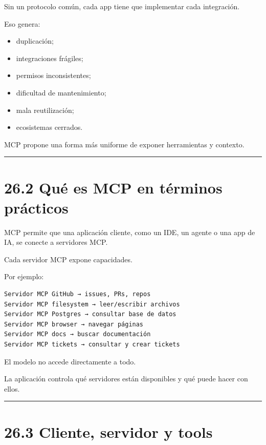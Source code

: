 Sin un protocolo común, cada app tiene que implementar cada integración.

Eso genera:

\begin{itemize}
\tightlist
\item
  duplicación;
\item
  integraciones frágiles;
\item
  permisos inconsistentes;
\item
  dificultad de mantenimiento;
\item
  mala reutilización;
\item
  ecosistemas cerrados.
\end{itemize}

MCP propone una forma más uniforme de exponer herramientas y contexto.

\begin{center}\rule{0.5\linewidth}{0.5pt}\end{center}

\section{26.2 Qué es MCP en términos
prácticos}\label{quuxe9-es-mcp-en-tuxe9rminos-pruxe1cticos}

MCP permite que una aplicación cliente, como un IDE, un agente o una app
de IA, se conecte a servidores MCP.

Cada servidor MCP expone capacidades.

Por ejemplo:

\begin{lstlisting}
Servidor MCP GitHub → issues, PRs, repos
Servidor MCP filesystem → leer/escribir archivos
Servidor MCP Postgres → consultar base de datos
Servidor MCP browser → navegar páginas
Servidor MCP docs → buscar documentación
Servidor MCP tickets → consultar y crear tickets
\end{lstlisting}

El modelo no accede directamente a todo.

La aplicación controla qué servidores están disponibles y qué puede
hacer con ellos.

\begin{center}\rule{0.5\linewidth}{0.5pt}\end{center}

\section{26.3 Cliente, servidor y tools}\label{cliente-servidor-y-tools}

